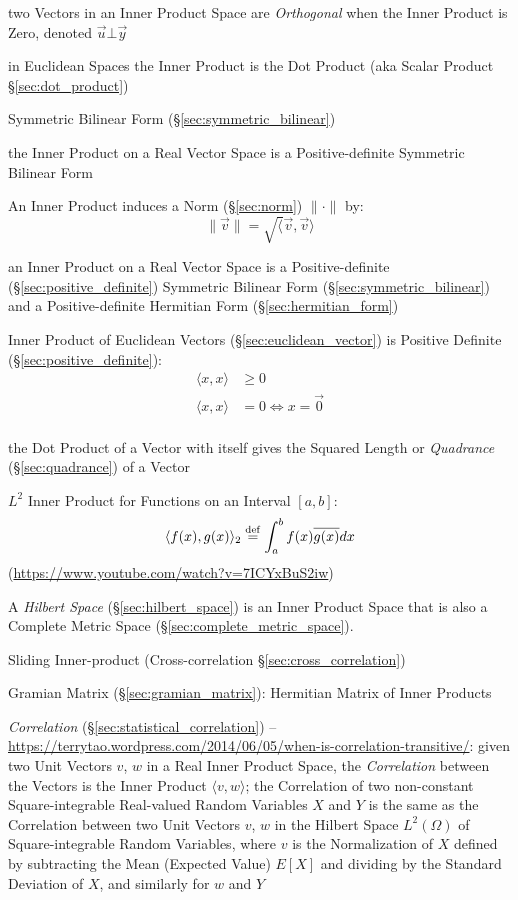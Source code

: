 two Vectors in an Inner Product Space are \emph{Orthogonal} when the Inner
Product is Zero, denoted $\vec{u} \bot \vec{y}$

in Euclidean Spaces the Inner Product is the Dot Product (aka Scalar Product
\S\ref{sec:dot_product})

Symmetric Bilinear Form (\S\ref{sec:symmetric_bilinear})

the Inner Product on a Real Vector Space is a Positive-definite Symmetric
Bilinear Form

An Inner Product induces a Norm (\S\ref{sec:norm}) $\|\cdot\|$ by:
\[
  \|\vec{v}\| = \sqrt\langle{\vec{v},\vec{v}}\rangle
\]

an Inner Product on a Real Vector Space is a Positive-definite
(\S\ref{sec:positive_definite}) Symmetric Bilinear Form
(\S\ref{sec:symmetric_bilinear}) and a Positive-definite Hermitian Form
(\S\ref{sec:hermitian_form})

Inner Product of Euclidean Vectors (\S\ref{sec:euclidean_vector}) is Positive
Definite (\S\ref{sec:positive_definite}):
\begin{align*}
  \langle{x,x}\rangle & \geq 0 \\
  \langle{x,x}\rangle & =    0 \Leftrightarrow x = \vec{0} \\
\end{align*}

the Dot Product of a Vector with itself gives the Squared Length or
\emph{Quadrance} (\S\ref{sec:quadrance}) of a Vector

$L^2$ Inner Product for Functions on an Interval $[a, b]$:
\[
  \langle{f(x), g(x)}\rangle_2 \stackrel{\mathrm{def}}= \int_a^b f(x) \overline{g(x)} dx
\]
(\url{https://www.youtube.com/watch?v=7ICYxBuS2iw})

A \emph{Hilbert Space} (\S\ref{sec:hilbert_space}) is an Inner Product Space
that is also a Complete Metric Space (\S\ref{sec:complete_metric_space}).

\fist Sliding Inner-product (Cross-correlation \S\ref{sec:cross_correlation})

\fist Gramian Matrix (\S\ref{sec:gramian_matrix}): Hermitian Matrix of Inner
Products

\emph{Correlation} (\S\ref{sec:statistical_correlation}) --
\url{https://terrytao.wordpress.com/2014/06/05/when-is-correlation-transitive/}:
given two Unit Vectors $v$, $w$ in a Real Inner Product Space, the
\emph{Correlation} between the Vectors is the Inner Product
$\langle{v,w}\rangle$; the Correlation of two non-constant Square-integrable
Real-valued Random Variables $X$ and $Y$ is the same as the Correlation between
two Unit Vectors $v$, $w$ in the Hilbert Space $L^2(\Omega)$ of
Square-integrable Random Variables, where $v$ is the Normalization of $X$
defined by subtracting the Mean (Expected Value) $E[X]$ and dividing by the
Standard Deviation of $X$, and similarly for $w$ and $Y$



